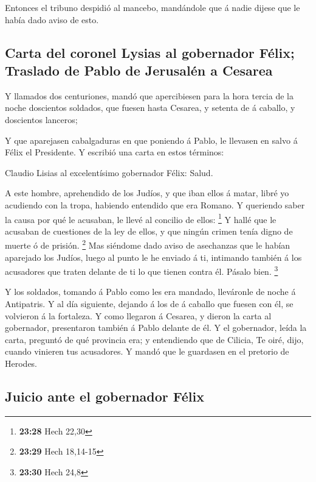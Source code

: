  Entonces el tribuno despidió al mancebo, mandándole que á
nadie dijese que le había dado aviso de esto.

\hypertarget{carta-del-coronel-lysias-al-gobernador-fuxe9lix-traslado-de-pablo-de-jerusaluxe9n-a-cesarea}{%
\subsection{Carta del coronel Lysias al gobernador Félix; Traslado de
Pablo de Jerusalén a
Cesarea}\label{carta-del-coronel-lysias-al-gobernador-fuxe9lix-traslado-de-pablo-de-jerusaluxe9n-a-cesarea}}

 Y llamados dos centuriones, mandó que apercibiesen para la
hora tercia de la noche doscientos soldados, que fuesen hasta Cesarea, y
setenta de á caballo, y doscientos lanceros;

 Y que aparejasen cabalgaduras en que poniendo á Pablo, le
llevasen en salvo á Félix el Presidente.  Y escribió una
carta en estos términos:

 Claudio Lisias al excelentísimo gobernador Félix: Salud.

 A este hombre, aprehendido de los Judíos, y que iban ellos
á matar, libré yo acudiendo con la tropa, habiendo entendido que era
Romano.  Y queriendo saber la causa por qué le acusaban, le
llevé al concilio de ellos: \footnote{\textbf{23:28} Hech 22,30}
 Y hallé que le acusaban de cuestiones de la ley de ellos,
y que ningún crimen tenía digno de muerte ó de prisión. \footnote{\textbf{23:29}
  Hech 18,14-15}  Mas siéndome dado aviso de asechanzas que
le habían aparejado los Judíos, luego al punto le he enviado á ti,
intimando también á los acusadores que traten delante de ti lo que
tienen contra él. Pásalo bien. \footnote{\textbf{23:30} Hech 24,8}

 Y los soldados, tomando á Pablo como les era mandado,
lleváronle de noche á Antipatris.  Y al día siguiente,
dejando á los de á caballo que fuesen con él, se volvieron á la
fortaleza.  Y como llegaron á Cesarea, y dieron la carta al
gobernador, presentaron también á Pablo delante de él.  Y
el gobernador, leída la carta, preguntó de qué provincia era; y
entendiendo que de Cilicia,  Te oiré, dijo, cuando vinieren
tus acusadores. Y mandó que le guardasen en el pretorio de Herodes.

\hypertarget{juicio-ante-el-gobernador-fuxe9lix}{%
\subsection{Juicio ante el gobernador
Félix}\label{juicio-ante-el-gobernador-fuxe9lix}}

